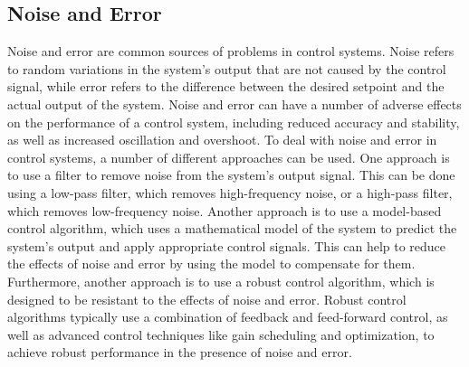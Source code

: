 \subsection{Noise and Error}
Noise and error are common sources of problems in control systems. Noise refers to random variations in the system's output that are not caused by the control signal, while error refers to the difference between the desired setpoint and the actual output of the system. Noise and error can have a number of adverse effects on the performance of a control system, including reduced accuracy and stability, as well as increased oscillation and overshoot. To deal with noise and error in control systems, a number of different approaches can be used. One approach is to use a filter to remove noise from the system's output signal. This can be done using a low-pass filter, which removes high-frequency noise, or a high-pass filter, which removes low-frequency noise. Another approach is to use a model-based control algorithm, which uses a mathematical model of the system to predict the system's output and apply appropriate control signals. This can help to reduce the effects of noise and error by using the model to compensate for them. Furthermore, another approach is to use a robust control algorithm, which is designed to be resistant to the effects of noise and error. Robust control algorithms typically use a combination of feedback and feed-forward control, as well as advanced control techniques like gain scheduling and optimization, to achieve robust performance in the presence of noise and error.



